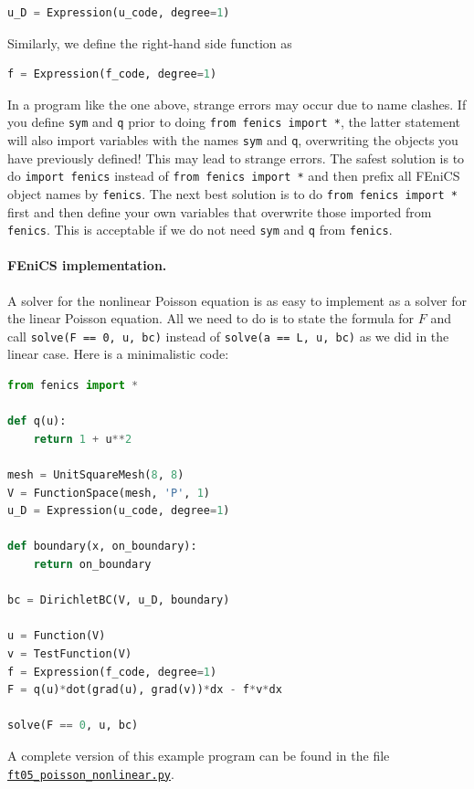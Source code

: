 \documentclass[graybox,envcountchap,sectrefs,final]{svmonodo}
\newenvironment{warning_mdfboxadmon}[1][]{
\begin{warning_mdfboxmdframed}[frametitle=#1]
}
{
\end{warning_mdfboxmdframed}
}
\begin{document}
\begin{lstlisting}[language=Python,style=graycolor]
u_D = Expression(u_code, degree=1)
\end{lstlisting}
Similarly, we define the right-hand side function as

\begin{lstlisting}[language=Python,style=graycolor]
f = Expression(f_code, degree=1)
\end{lstlisting}

\begin{warning_mdfboxadmon}
In a program like the one above, strange errors may occur due to
name clashes. If you define \texttt{sym} and \texttt{q} prior to doing
\texttt{from fenics import *}, the latter statement will also import
variables with the names \texttt{sym} and \texttt{q}, overwriting
the objects you have previously defined! This may lead to strange
errors. The safest solution is to do \texttt{import fenics} instead of
\texttt{from fenics import *} and then prefix all FEniCS
object names by \texttt{fenics}. The next best solution is to do
\texttt{from fenics import *} first and then define your own variables
that overwrite those imported from \texttt{fenics}. This is acceptable
if we do not need \texttt{sym} and \texttt{q} from \texttt{fenics}.
\end{warning_mdfboxadmon} %

\paragraph{FEniCS implementation.}
A solver for the nonlinear Poisson equation is as easy to
implement as a solver for the linear Poisson equation.
All we need to do is to state the formula for $F$ and call
\texttt{solve(F == 0, u, bc)} instead of \texttt{solve(a == L, u, bc)} as we did
in the linear case. Here is a minimalistic code:

\begin{lstlisting}[language=Python,style=graycolor]
from fenics import *

def q(u):
    return 1 + u**2

mesh = UnitSquareMesh(8, 8)
V = FunctionSpace(mesh, 'P', 1)
u_D = Expression(u_code, degree=1)

def boundary(x, on_boundary):
    return on_boundary

bc = DirichletBC(V, u_D, boundary)

u = Function(V)
v = TestFunction(V)
f = Expression(f_code, degree=1)
F = q(u)*dot(grad(u), grad(v))*dx - f*v*dx

solve(F == 0, u, bc)
\end{lstlisting}
A complete version of this example program can be found in the file \href{{https://fenicsproject.org/pub/tutorial/python/vol1/ft05_poisson_nonlinear.py}}{\nolinkurl{ft05_poisson_nonlinear.py}}.
\end{document}
